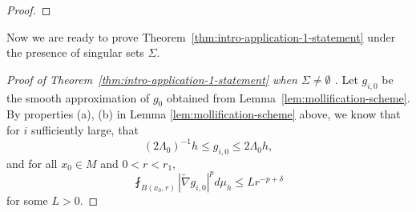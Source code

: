 \documentclass[12pt]{amsart}
\newcommand{\hdel}{\tilde{\nabla}}
\theoremstyle{remark}
\numberwithin{equation}{section}
\begin{document}
\begin{proof}
%    
%    
\end{proof}

Now we are ready to prove Theorem~\ref{thm:intro-application-1-statement} under the presence of singular sets $\Sigma$.
\begin{proof}[Proof of Theorem~\ref{thm:intro-application-1-statement} when $\Sigma\neq \emptyset$ ]

Let $g_{i,0}$ be the smooth approximation of $g_0$ obtained from Lemma~\ref{lem:mollification-scheme}.   By properties (a), (b) in Lemma \ref{lem:mollification-scheme} above, we know that for $i$ sufficiently large, that
    \begin{equation}\label{eqn:rough-initial-gi0-Linfty}
        (2\Lambda_0)^{-1}h \leq g_{i,0} \leq 2\Lambda_0 h,
    \end{equation}
    and for all $x_0\in M$ and $0<r<r_1$,
    \begin{equation}\label{eqn:rough-initial-gi0-Morrey}
        \fint_{B(x_0, r)} |\hdel g_{i,0}|^p d\mu_h \leq L r^{-p+\delta}
    \end{equation}
    for some $L> 0$. 
    

\end{proof}
\end{document}
